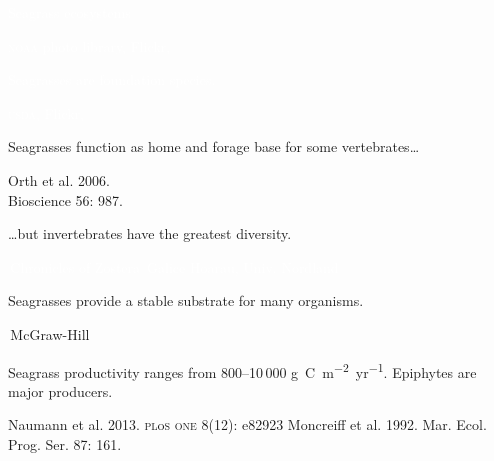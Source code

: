 \documentclass[t]{beamer}
\begin{document}

{
\begin{frame}[b]{\textcolor{white}{Seagrass ecosystems}}

	\hfill \tiny\textcolor{white}{\textsc{noaa} photo library, Flickr, }
\end{frame}
}
%
{
\begin{frame}[b]{\textcolor{white}{Seagrasses are foundation species.}}

	\hfill \tiny\textcolor{white}{\textsc{usda}, Flickr, }
\end{frame}
}
%
{
\begin{frame}[b]{Seagrasses function as home and forage base for some vertebrates\dots}

	\hfill \tiny Orth et al. 2006. \\ \hfill Bioscience 56: 987.
\end{frame}
}
%
{
\begin{frame}[b]{\dots but invertebrates have the greatest diversity.}

	\tiny \textcolor{white}{\textcopyright\,Chronicles of Zostera}  \hfill \textcolor{white}{\textcopyright\,Galice Hoarau, Univ. Nordland}
\end{frame}
}
%
{
\begin{frame}[b]{Seagrasses provide a stable substrate for many organisms.}

	\hfill \tiny\textcopyright\,McGraw-Hill
\end{frame}
}
%
{
\begin{frame}[t]{}

	\vspace*{2\baselineskip}
	
	\hspace{55mm}\parbox{65mm}{\raggedright \Large Seagrass productivity ranges from 800–10\,000 \si{g.C.m^{-2}.yr^{-1}}.\vspace*{\baselineskip} Epiphytes are major producers.}
	
	\vfilll
	
	\tiny Naumann et al. 2013. \textsc{pl}o\textsc{s one} 8(12): e82923 \hfill Moncreiff et al. 1992. Mar. Ecol. Prog. Ser. 87: 161.
\end{frame}
}
\end{document}
